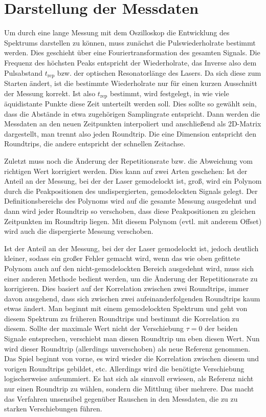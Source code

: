 \documentclass[bachelor,       %
               twoside,        %
               BCOR10mm,       %
               liststotoc,nomtotoc,bibtotoc, %
               english,ngerman, %
               final,          %
               ]{GAUBM}
\begin{document}
\section{Darstellung der Messdaten}
Um durch eine lange Messung mit dem Oszilloskop die Entwicklung des Spektrums darstellen zu können, muss zunächst die Pulswiederholrate bestimmt werden.
Dies geschieht über eine Fouriertransformation des gesamten Signals.
Die Frequenz des höchsten Peaks entspricht der Wiederholrate, das Inverse also dem Pulsabstand $t_\text{rep}$ bzw. der optischen Resonatorlänge des Lasers.
Da sich diese zum Starten ändert, ist die bestimmte Wiederholrate nur für einen kurzen Ausschnitt der Messung korrekt.
Ist also $t_\text{rep}$ bestimmt, wird festgelegt, in wie viele äquidistante Punkte diese Zeit unterteilt werden soll.
Dies sollte so gewählt sein, dass die Abstände in etwa zugehörigen Samplingrate entspricht.
Dann werden die Messdaten an den neuen Zeitpunkten interpoliert und anschließend als 2D-Matrix dargestellt, man trennt also jeden Roundtrip.
Die eine Dimension entspricht den Roundtrips, die andere entspricht der schnellen Zeitachse.

Zuletzt muss noch die Änderung der Repetitionsrate bzw. die Abweichung vom richtigen Wert korrigiert werden.
Dies kann auf zwei Arten geschehen:
Ist der Anteil an der Messung, bei der der Laser gemodelockt ist, groß, wird ein Polynom durch die Peakpositionen des undispergierten, gemodelockten Signals gelegt. Der Definitionsbereichs des Polynoms wird auf die gesamte Messung ausgedehnt und dann wird jeder Roundtrip so verschoben, dass diese Peakpositionen zu gleichen Zeitpunkten im Roundtrip liegen.
Mit diesem Polynom (evtl. mit anderem Offset) wird auch die dispergierte Messung verschoben.

Ist der Anteil an der Messung, bei der der Laser gemodelockt ist, jedoch deutlich kleiner, sodass ein großer Fehler gemacht wird, wenn das wie oben gefittete Polynom auch auf den nicht-gemodelockten Bereich ausgedehnt wird, muss sich einer anderen Methode bedient werden, um die Änderung der Repetitionsrate zu korrigieren.
Dies basiert auf der Korrelation zwischen zwei Roundtrips, immer davon ausgehend, dass sich zwischen zwei aufeinanderfolgenden Roundtrips kaum etwas ändert.
Man beginnt mit einem gemodelockten Spektrum und geht von diesem Spektrum zu früheren Roundtrips und bestimmt die Korrelation zu diesem.
Sollte der maximale Wert nicht der Verschiebung $\tau=0$ der beiden Signale entsprechen, verschiebt man diesen Roundtrip um eben diesen Wert.
Nun wird dieser Roundtrip (allerdings unverschoben) als neue Referenz genommen.
Das Spiel beginnt von vorne, es wird wieder die Korrelation zwischen diesem und vorigen Roundtrips gebildet, etc.
Allerdings wird die benötigte Verschiebung logischerweise aufsummiert.
Es hat sich als sinnvoll erwiesen, als Referenz nicht nur einen Roundtrip zu wählen, sondern die Mittlung über mehrere.
Das macht das Verfahren unsensibel gegenüber Rauschen in den Messdaten, die zu zu starken Verschiebungen führen.
\end{document}
